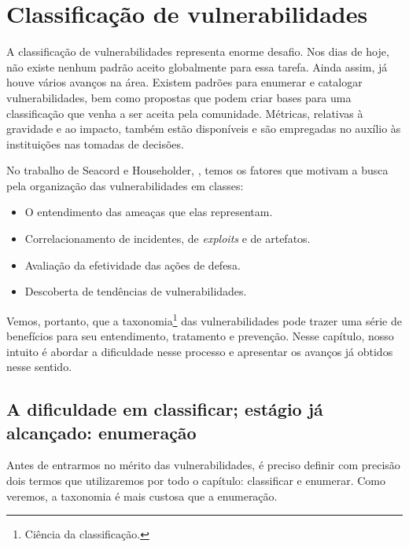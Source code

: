 
\chapter{Classificação de vulnerabilidades}
\label{chap:classificacao}

	A classificação de vulnerabilidades representa enorme desafio.
	Nos dias de hoje, não existe nenhum padrão aceito globalmente para essa tarefa.
	Ainda assim, já houve vários avanços na área. 
	Existem padrões para enumerar e catalogar vulnerabilidades, bem como propostas
	que podem criar bases para uma classificação que venha a ser aceita pela comunidade.
	Métricas, relativas	à gravidade e ao impacto, também estão disponíveis
	e são empregadas no auxílio às instituições nas tomadas	de decisões.

	
	No trabalho de Seacord e Householder, \cite{Seacord2005}, temos os fatores que motivam a
	busca pela organização das vulnerabilidades em classes:
	\begin{itemize}
		\item{O entendimento das ameaças que elas representam.}
		\item{Correlacionamento de incidentes, de \textsl{exploits} e de artefatos.}
		\item{Avaliação da efetividade das ações de defesa.}
		\item{Descoberta de tendências de vulnerabilidades.}
	\end{itemize}

	
	Vemos, portanto, que a taxonomia\footnote{Ciência da classificação.} das vulnerabilidades
	pode trazer uma série de benefícios para seu entendimento, tratamento e prevenção.
	Nesse capítulo, nosso intuito é abordar a dificuldade nesse processo e apresentar
	os avanços já obtidos nesse sentido.  


	\section{A dificuldade em classificar; estágio já alcançado: enumeração}
		Antes de entrarmos no mérito das vulnerabilidades, é preciso definir
		com precisão dois termos que utilizaremos por todo o capítulo: classificar e enumerar.
		Como veremos, a taxonomia é mais custosa que a enumeração.

